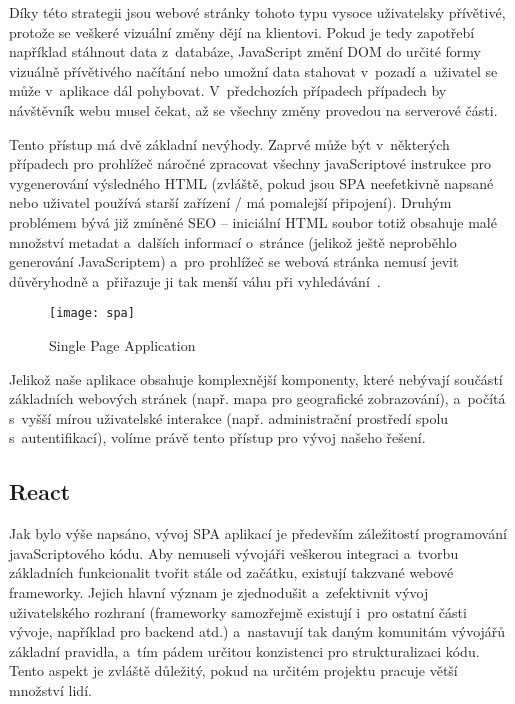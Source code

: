 Díky této strategii jsou webové stránky tohoto typu vysoce uživatelsky přívětivé, protože se veškeré vizuální změny dějí na klientovi. Pokud je tedy zapotřebí například stáhnout data z~databáze, JavaScript změní DOM do určité formy vizuálně přívětivého načítání nebo umožní data stahovat v~pozadí a~uživatel se může v~aplikace dál pohybovat. V~předchozích případech případech by návštěvník webu musel čekat, až se všechny změny provedou na serverové části.

Tento přístup má dvě základní nevýhody. Zaprvé může být v~některých případech pro prohlížeč náročné zpracovat všechny javaScriptové instrukce pro vygenerování výsledného HTML (zvláště, pokud jsou SPA neefetkivně napsané nebo uživatel používá starší zařízení / má pomalejší připojení). Druhým problémem bývá již zmíněné SEO -- iniciální HTML soubor totiž obsahuje malé množství metadat a~dalších informací o~stránce (jelikož ještě neproběhlo generování JavaScriptem) a~pro prohlížeč se webová stránka nemusí jevit důvěryhodně a~přiřazuje ji tak menší váhu při vyhledávání~\parencite{spa}.

\begin{figure}[ht]   
    \centering
    \texttt{[image: spa]}  
    \caption{Single Page Application}
    \label{spa}
 \end{figure}

Jelikož naše aplikace obsahuje komplexnější komponenty, které nebývají součástí základních webových stránek (např. mapa pro geografické zobrazování), a~počítá s~vyšší mírou uživatelské interakce (např. administrační prostředí spolu s~autentifikací), volíme právě tento přístup pro vývoj našeho řešení.

\hypertarget{react}{%
\subsection{React}\label{react}}

Jak bylo výše napsáno, vývoj SPA aplikací je především záležitostí programování javaScriptového kódu. Aby nemuseli vývojáři veškerou integraci a~tvorbu základních funkcionalit tvořit stále od začátku, existují takzvané webové frameworky. Jejich hlavní význam je zjednodušit a~zefektivnit vývoj uživatelského rozhraní (frameworky samozřejmě existují i~pro ostatní části vývoje, například pro backend atd.) a~nastavují tak daným komunitám vývojářů základní pravidla, a~tím pádem určitou konzistenci pro strukturalizaci kódu. Tento aspekt je zvláště důležitý, pokud na určitém projektu pracuje větší množství lidí.

